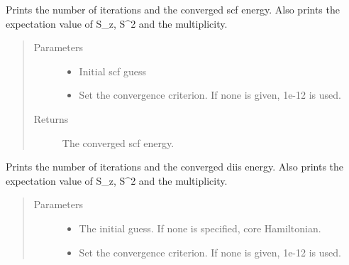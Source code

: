 \documentclass[letterpaper,10pt,english]{sphinxmanual}
\begin{document}
\begin{fulllineitems}
\begin{fulllineitems}
\label{\detokenize{cUHF_b:hf.cUHF_b.CUHF.get_scf_solution}}
Prints the number of iterations and the converged scf energy.
Also prints the expectation value of S\_z, S\textasciicircum{}2 and the multiplicity.
\begin{quote}\begin{description}
\item[{Parameters}] \leavevmode\begin{itemize}
\item {} 
 \textendash{} Initial scf guess

\item {} 
 \textendash{} Set the convergence criterion. If none is given, 1e-12 is used.

\end{itemize}

\item[{Returns}] \leavevmode
The converged scf energy.

\end{description}\end{quote}

\end{fulllineitems}


\begin{fulllineitems}
\label{\detokenize{cUHF_b:hf.cUHF_b.CUHF.get_scf_solution_diis}}
Prints the number of iterations and the converged diis energy.
Also prints the expectation value of S\_z, S\textasciicircum{}2 and the multiplicity.
\begin{quote}\begin{description}
\item[{Parameters}] \leavevmode\begin{itemize}
\item {} 
 \textendash{} The initial guess. If none is specified, core Hamiltonian.

\item {} 
 \textendash{} Set the convergence criterion. If none is given, 1e-12 is used.


\end{itemize}
\end{description}
\end{quote}
\end{fulllineitems}
\end{fulllineitems}
\end{document}
